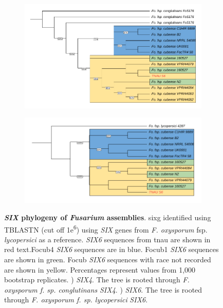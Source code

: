 \begin{figure}[hp!]
\centering
    \begin{subfigure}[]{0.9\textwidth}
        \centering
        \includegraphics[width=\textwidth]{Figures/FusSIX4.phylo.pdf}
        \caption{}
        \label{fig:FusSIX4.phylo}
    \end{subfigure}
        \begin{subfigure}[]{0.9\textwidth}
        \centering
        \includegraphics[width=\textwidth]{Figures/FusSIX6.phylo.pdf}
        \caption{}
        \label{fig:FusSIX6.phylo}
    \end{subfigure}
    \caption[\textit{SIX} gene phylogeny of \textit{Fusarium} assemblies]{\textbf{\textit{SIX} phylogeny of \textit{Fusarium} assemblies}.
    \acl{sixg} identified using TBLASTN (cut off 1\-e\textsuperscript{6}) using \textit{SIX} genes from \textit{F. oxysporum} fsp. \textit{lycopersici} as a reference. \textit{SIX6} sequences from \ac{tnau} are shown in red text.\Acl{Focub4} \textit{SIX6} sequences are in blue. \Acl{Focub1} \textit{SIX6} sequences are shown in green. \acl{Focub} \textit{SIX6} sequences with race not recorded are shown in yellow. Percentages represent values from 1,000 bootstrap replicates. ) \textit{SIX4}. The tree is rooted through \textit{F. oxysporum f. sp. conglutinans} \textit{SIX4}. ) \textit{SIX6}. The tree is rooted through \textit{F. oxysporum f. sp. lycopersici} \textit{SIX6}.}
    \label{fig:FusSIXMultiPhylo}
\end{figure}

